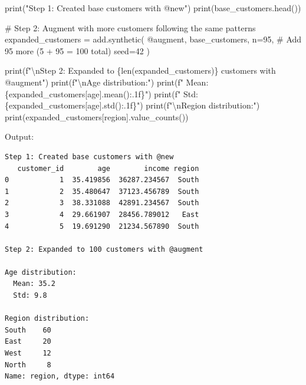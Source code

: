 \documentclass[
  letterpaper,
]{scrbook}
\newenvironment{Shaded}{\begin{snugshade}}{\end{snugshade}}
\newcommand{\BuiltInTok}[1]{\textcolor[rgb]{0.00,0.23,0.31}{#1}}
\newcommand{\CharTok}[1]{\textcolor[rgb]{0.13,0.47,0.30}{#1}}
\newcommand{\CommentTok}[1]{\textcolor[rgb]{0.37,0.37,0.37}{#1}}
\newcommand{\DecValTok}[1]{\textcolor[rgb]{0.68,0.00,0.00}{#1}}
\newcommand{\NormalTok}[1]{\textcolor[rgb]{0.00,0.23,0.31}{#1}}
\newcommand{\OperatorTok}[1]{\textcolor[rgb]{0.37,0.37,0.37}{#1}}
\newcommand{\SpecialCharTok}[1]{\textcolor[rgb]{0.37,0.37,0.37}{#1}}
\newcommand{\SpecialStringTok}[1]{\textcolor[rgb]{0.13,0.47,0.30}{#1}}
\newcommand{\StringTok}[1]{\textcolor[rgb]{0.13,0.47,0.30}{#1}}
\begin{document}
\begin{Shaded}
\begin{Highlighting}[]
\BuiltInTok{print}\NormalTok{(}\StringTok{"Step 1: Created base customers with @new"}\NormalTok{)}
\BuiltInTok{print}\NormalTok{(base\_customers.head())}

\CommentTok{\# Step 2: Augment with more customers following the same patterns}
\NormalTok{expanded\_customers }\OperatorTok{=}\NormalTok{ add.synthetic(}
    \StringTok{\textquotesingle{}@augment\textquotesingle{}}\NormalTok{,}
\NormalTok{    base\_customers,}
\NormalTok{    n}\OperatorTok{=}\DecValTok{95}\NormalTok{,  }\CommentTok{\# Add 95 more (5 + 95 = 100 total)}
\NormalTok{    seed}\OperatorTok{=}\DecValTok{42}
\NormalTok{)}

\BuiltInTok{print}\NormalTok{(}\SpecialStringTok{f"}\CharTok{\textbackslash{}n}\SpecialStringTok{Step 2: Expanded to }\SpecialCharTok{\{}\BuiltInTok{len}\NormalTok{(expanded\_customers)}\SpecialCharTok{\}}\SpecialStringTok{ customers with @augment"}\NormalTok{)}
\BuiltInTok{print}\NormalTok{(}\SpecialStringTok{f"}\CharTok{\textbackslash{}n}\SpecialStringTok{Age distribution:"}\NormalTok{)}
\BuiltInTok{print}\NormalTok{(}\SpecialStringTok{f"  Mean: }\SpecialCharTok{\{}\NormalTok{expanded\_customers[}\StringTok{\textquotesingle{}age\textquotesingle{}}\NormalTok{]}\SpecialCharTok{.}\NormalTok{mean()}\SpecialCharTok{:.1f\}}\SpecialStringTok{"}\NormalTok{)}
\BuiltInTok{print}\NormalTok{(}\SpecialStringTok{f"  Std: }\SpecialCharTok{\{}\NormalTok{expanded\_customers[}\StringTok{\textquotesingle{}age\textquotesingle{}}\NormalTok{]}\SpecialCharTok{.}\NormalTok{std()}\SpecialCharTok{:.1f\}}\SpecialStringTok{"}\NormalTok{)}
\BuiltInTok{print}\NormalTok{(}\SpecialStringTok{f"}\CharTok{\textbackslash{}n}\SpecialStringTok{Region distribution:"}\NormalTok{)}
\BuiltInTok{print}\NormalTok{(expanded\_customers[}\StringTok{\textquotesingle{}region\textquotesingle{}}\NormalTok{].value\_counts())}
\end{Highlighting}
\end{Shaded}

Output:

\begin{verbatim}
Step 1: Created base customers with @new
   customer_id        age        income region
0            1  35.419856  36287.234567  South
1            2  35.480647  37123.456789  South
2            3  38.331088  42891.234567  South
3            4  29.661907  28456.789012   East
4            5  19.691290  21234.567890  South

Step 2: Expanded to 100 customers with @augment

Age distribution:
  Mean: 35.2
  Std: 9.8

Region distribution:
South    60
East     20
West     12
North     8
Name: region, dtype: int64
\end{verbatim}
\end{document}
